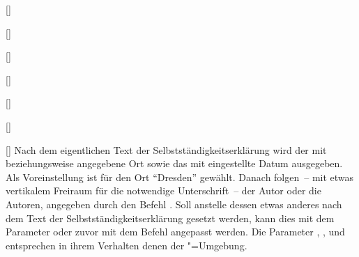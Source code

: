 \begin{Declaration}{}
\begin{Declaration}{[]}
\begin{Declaration}{[]}
\begin{Declaration}{[]}
\begin{Declaration}{[]}
\begin{Declaration}[v2.02]{%
  []%
}
\begin{Declaration}[v2.02]{%
  []%
}
\begin{Declaration}{[\PSet]}
Nach dem eigentlichen Text der Selbstständigkeitserklärung wird der mit 
 beziehungsweise  angegebene Ort 
sowie das mit  eingestellte Datum ausgegeben. Als Voreinstellung 
ist für den Ort \enquote{Dresden} gewählt. Danach folgen~-- mit etwas 
vertikalem Freiraum für die notwendige Unterschrift~-- der Autor oder die 
Autoren, angegeben durch den Befehl . Soll anstelle dessen etwas 
anderes nach dem Text der Selbstständigkeitserklärung gesetzt werden, kann dies 
mit dem Parameter  oder zuvor mit dem 
Befehl  angepasst werden. Die Parameter 
, 
, 
 und 
 entsprechen in ihrem Verhalten denen 
der "=Umgebung.
\end{Declaration}
\end{Declaration}
\end{Declaration}
\end{Declaration}
\end{Declaration}
\end{Declaration}
\end{Declaration}
\end{Declaration}

